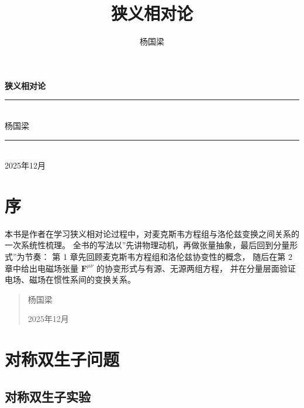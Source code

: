 \documentclass[
  chinese,
  a4paper,
  UTF8,
  12pt,
  oneside,
  openany]{ctexbook}
\title{狭义相对论}
\author{杨国梁}
\date{}
\let\maketitle\relax
\renewcommand*\contentsname{目录}
\newcommand\contentsname{目录}
\begin{document}
\frontmatter
\maketitle

\begin{titlepage}
  \thispagestyle{empty}
  \begin{center}
    \vspace*{2cm}
    {\Huge\bfseries\color{blue!50!black} 狭义相对论}\\[1.2cm]
    \rule{\linewidth}{0.6pt}\\[1cm]
    {\Large 杨国梁}\\[1cm]
    \rule{\linewidth}{0.6pt}\\[2cm]
    {\large 2025年12月}\\[1cm]
  \end{center}
\end{titlepage}
\cleardoublepage
\frontmatter

\renewcommand*\contentsname{目录}
{
\setcounter{tocdepth}{2}
\tableofcontents
}
\listoftables

\mainmatter
\newpage

\chapter*{序}\label{preface}

本书是作者在学习狭义相对论过程中，对麦克斯韦方程组与洛伦兹变换之间关系的一次系统性梳理。
全书的写法以''先讲物理动机，再做张量抽象，最后回到分量形式''为节奏： 第
1 章先回顾麦克斯韦方程组和洛伦兹协变性的概念， 随后在第 2
章中给出电磁场张量 \(\mathbf{F}^{\mu\nu}\)
的协变形式与有源、无源两组方程，
并在分量层面验证电场、磁场在惯性系间的变换关系。

\begin{quote}
杨国梁

2025年12月
\end{quote}

\newpage

\mainmatter

\chapter{对称双生子问题}\label{ux5bf9ux79f0ux53ccux751fux5b50ux95eeux9898}

\section{对称双生子实验}\label{ux5bf9ux79f0ux53ccux751fux5b50ux5b9eux9a8c}
\end{document}
